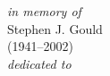 \thispagestyle{empty}
    \null{}
        \begin{flushright}
                \emph{in memory of}\\
                Stephen J. Gould\\
                (1941--2002)\\
                \bigskip{}
                \emph{dedicated to}\\
        \end{flushright}
\null

